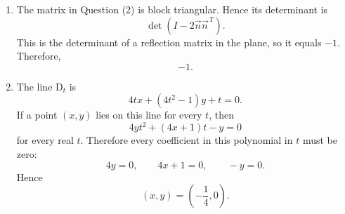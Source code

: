 \documentclass[10pt,a4paper]{article}
\begin{document}
\begin{enumerate}
  \item The matrix in Question (2) is block triangular. Hence its determinant is
        \[
          \det(I-2\vec{n}\vec{n}^{\,T}).
        \]
        This is the determinant of a reflection matrix in the plane, so it equals $-1$. Therefore,
        \[
          \boxed{-1}.
        \]

  \item The line D$_t$ is
        \[
          4tx+(4t^2-1)y+t=0.
        \]
        If a point $(x,y)$ lies on this line for every $t$, then
        \[
          4yt^2+(4x+1)t-y=0
        \]
        for every real $t$. Therefore every coefficient in this polynomial in $t$ must be zero:
        \[
          4y=0,\qquad 4x+1=0,\qquad -y=0.
        \]
        Hence
        \[
          \boxed{(x,y)=\left(-\frac14,0\right)}.
        \]


\end{enumerate}
\end{document}
